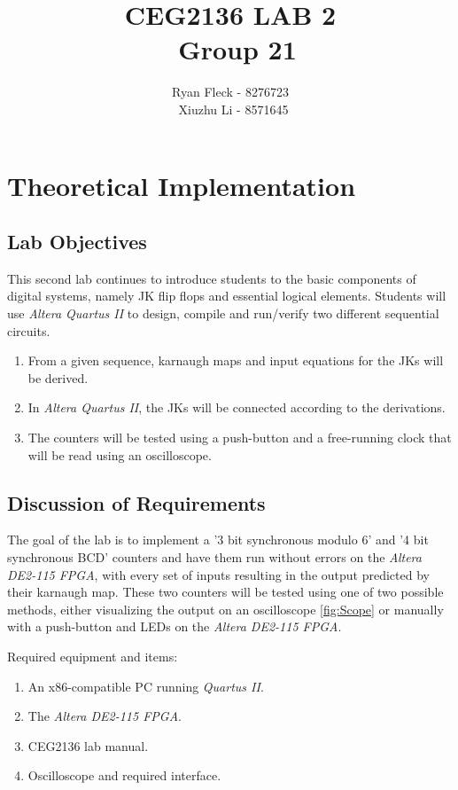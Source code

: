 \documentclass[a4paper,12pt]{article}
\begin{document}
\title{CEG2136 LAB 2 \\\ Group 21}
\author{Ryan Fleck - 8276723 \\\ Xiuzhu Li - 8571645}
\maketitle
\newpage
{}
\tableofcontents
\listoffigures
\newpage
{}  


\section{Theoretical Implementation}

\subsection{Lab Objectives}
This second lab continues to introduce students to the basic components of digital systems, namely JK flip flops and essential logical elements. Students will use \textit{Altera Quartus II} to design, compile and run/verify two different sequential circuits.
\begin{enumerate}
\item From a given sequence, karnaugh maps and input equations for the JKs will be derived.
\item In \textit{Altera Quartus II}, the JKs will be connected according to the derivations.
\item The counters will be tested using a push-button and a free-running clock that will be read using an oscilloscope.
\end{enumerate}

\subsection{Discussion of Requirements}
The goal of the lab is to implement a '3 bit synchronous modulo 6' and '4 bit synchronous BCD' counters and have them run without errors on the \textit{Altera DE2-115 FPGA}, with every set of inputs resulting in the output predicted by their karnaugh map. These two counters will be tested using one of two possible methods, either visualizing the output on an oscilloscope \ref{fig:Scope} or manually with a push-button and LEDs on the \textit{Altera DE2-115 FPGA}.


Required equipment and items:
\begin{enumerate}
\item An x86-compatible PC running \textit{Quartus II}.
\item The \textit{Altera DE2-115 FPGA}.
\item CEG2136 lab manual.
\item Oscilloscope and required interface.
\end{enumerate}
\end{document}
